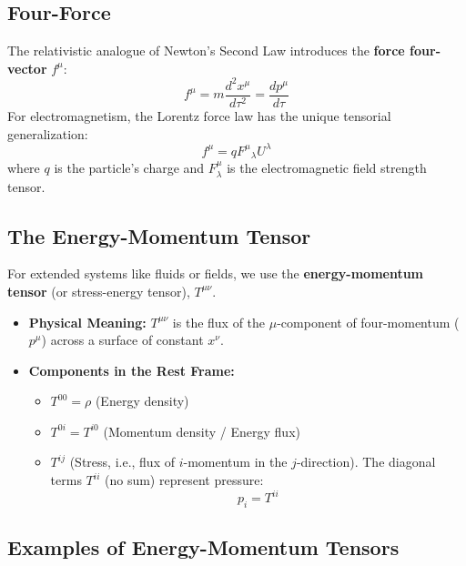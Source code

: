 \documentclass[11pt, a4paper]{report}
\begin{document}
\subsection*{Four-Force}

The relativistic analogue of Newton's Second Law introduces the \textbf{force four-vector} $f^\mu$:
\begin{equation}
    f^\mu = m\frac{d^2 x^\mu}{d\tau^2} = \frac{dp^\mu}{d\tau}
\end{equation}
For electromagnetism, the Lorentz force law has the unique tensorial generalization:
\begin{equation}
    f^\mu = q {F^\mu}_\lambda U^\lambda
\end{equation}
where $q$ is the particle's charge and $F^\mu_\lambda$ is the electromagnetic field strength tensor.

\subsection*{The Energy-Momentum Tensor}

For extended systems like fluids or fields, we use the \textbf{energy-momentum tensor} (or stress-energy tensor), $T^{\mu\nu}$.
\begin{itemize}
    \item \textbf{Physical Meaning:} $T^{\mu\nu}$ is the flux of the $\mu$-component of four-momentum ($p^\mu$) across a surface of constant $x^\nu$.
    \item \textbf{Components in the Rest Frame:}
    \begin{itemize}
        \item $T^{00} = \rho$ (Energy density)
        \item $T^{0i} = T^{i0}$ (Momentum density / Energy flux)
        \item $T^{ij}$ (Stress, i.e., flux of $i$-momentum in the $j$-direction). The diagonal terms $T^{ii}$ (no sum) represent pressure:
        \begin{equation}
            p_i = T^{ii}
        \end{equation}
    \end{itemize}
\end{itemize}

\subsection*{Examples of Energy-Momentum Tensors}
\end{document}
